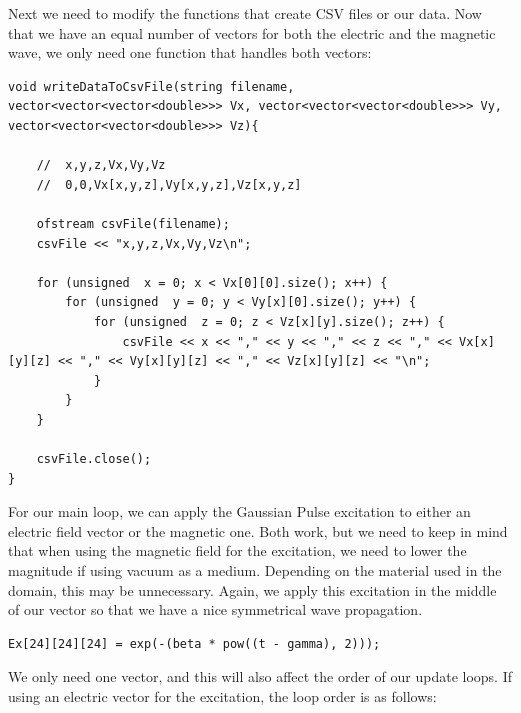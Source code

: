 Next we need to modify the functions that create CSV files or our data. Now that we have an equal number of vectors for both the electric and the magnetic wave, we only need one function that handles both vectors:

\begin{verbatim}
void writeDataToCsvFile(string filename, vector<vector<vector<double>>> Vx, vector<vector<vector<double>>> Vy, vector<vector<vector<double>>> Vz){
	
	//	x,y,z,Vx,Vy,Vz
	//	0,0,Vx[x,y,z],Vy[x,y,z],Vz[x,y,z]
	
	ofstream csvFile(filename);
	csvFile << "x,y,z,Vx,Vy,Vz\n";
	
	for (unsigned  x = 0; x < Vx[0][0].size(); x++) {
		for (unsigned  y = 0; y < Vy[x][0].size(); y++) {
			for (unsigned  z = 0; z < Vz[x][y].size(); z++) {
				csvFile << x << "," << y << "," << z << "," << Vx[x][y][z] << "," << Vy[x][y][z] << "," << Vz[x][y][z] << "\n";
			}
		}
	}
	
	csvFile.close();
}
\end{verbatim}

For our main loop, we can apply the Gaussian Pulse excitation to either an electric field vector or the magnetic one. Both work, but we need to keep in mind that when using the magnetic field for the excitation, we need to lower the magnitude if using vacuum as a medium. Depending on the material used in the domain, this may be unnecessary. Again, we apply this excitation in the middle of our vector so that we have a nice symmetrical wave propagation.

\begin{verbatim}
Ex[24][24][24] = exp(-(beta * pow((t - gamma), 2)));
\end{verbatim}

We only need one vector, and this will also affect the order of our update loops. If using an electric vector for the excitation, the loop order is as follows:

